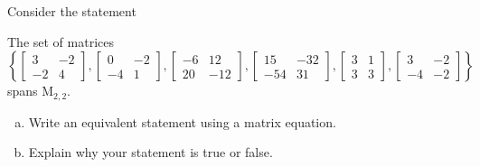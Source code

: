 
\begin{exerciseStatement}


Consider the statement 
\begin{center}\begin{minipage}{0.8\textwidth}
 The set of matrices \( \left\{ \left[\begin{array}{cc}
3 & -2 \\
-2 & 4
\end{array}\right] , \left[\begin{array}{cc}
0 & -2 \\
-4 & 1
\end{array}\right] , \left[\begin{array}{cc}
-6 & 12 \\
20 & -12
\end{array}\right] , \left[\begin{array}{cc}
15 & -32 \\
-54 & 31
\end{array}\right] , \left[\begin{array}{cc}
3 & 1 \\
3 & 3
\end{array}\right] , \left[\begin{array}{cc}
3 & -2 \\
-4 & -2
\end{array}\right] \right\} \) spans \(\mathrm{M}_{2,2}\). 
\end{minipage}\end{center}
    


\begin{enumerate}[(a)]
\item  Write an equivalent statement using a matrix equation.
\item  Explain why your statement is true or false.
\end{enumerate}
    
\end{exerciseStatement}
    
